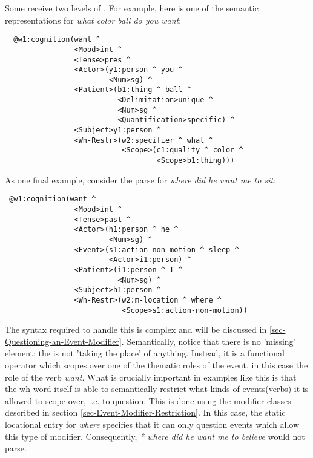 Some  receive two levels of . For example, here is one of the semantic representations for \emph{what color ball do you want}:
\begin{verbatim}
  @w1:cognition(want ^ 
                <Mood>int ^ 
                <Tense>pres ^ 
                <Actor>(y1:person ^ you ^ 
                        <Num>sg) ^ 
                <Patient>(b1:thing ^ ball ^ 
                          <Delimitation>unique ^ 
                          <Num>sg ^ 
                          <Quantification>specific) ^ 
                <Subject>y1:person ^ 
                <Wh-Restr>(w2:specifier ^ what ^ 
                           <Scope>(c1:quality ^ color ^ 
                                   <Scope>b1:thing)))
\end{verbatim}
As one final example, consider the parse for \emph{where did he want me to sit}:
\begin{verbatim}
 @w1:cognition(want ^ 
                <Mood>int ^ 
                <Tense>past ^ 
                <Actor>(h1:person ^ he ^ 
                        <Num>sg) ^ 
                <Event>(s1:action-non-motion ^ sleep ^ 
                        <Actor>i1:person) ^ 
                <Patient>(i1:person ^ I ^ 
                          <Num>sg) ^ 
                <Subject>h1:person ^ 
                <Wh-Restr>(w2:m-location ^ where ^ 
                           <Scope>s1:action-non-motion))
\end{verbatim} 
The syntax required to handle this is complex and will be discussed in \ref{sec-Questioning-an-Event-Modifier}. Semantically, notice that there is no 'missing' element: the  is not 'taking the place' of anything. Instead, it is a functional operator which scopes over one of the thematic roles of the event, in this case the  role of the verb \emph{want}. What is crucially important in examples like this is that the wh-word itself is able to semantically restrict what kinds of events(verbs) it is allowed to scope over, i.e. to question. This is done using the modifier classes described in section \ref{sec-Event-Modifier-Restriction}.  In this case, the static locational entry for \emph{where} specifies that it can only question events which allow this type of modifier. Consequently, \emph{* where did he want me to believe} would not parse.